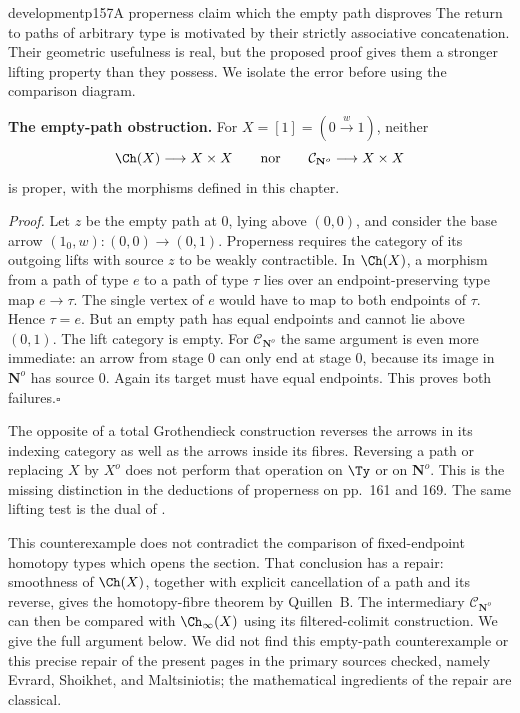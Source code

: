 \begin{dcomment}{development}{p157}{A properness claim which the empty path disproves}
The return to paths of arbitrary type is motivated by their strictly associative concatenation. Their geometric usefulness is real, but the proposed proof gives them a stronger lifting property than they possess. We isolate the error before using the comparison diagram.

\textbf{The empty-path obstruction.}\ours\quad
For $X=[1]=(0\xrightarrow{w}1)$, neither
\[
 \Ch(X)\longrightarrow X\times X
 \qquad\text{nor}\qquad
 \mathcal C_{\mathbf N^o}\longrightarrow X\times X
\]
is proper, with the morphisms defined in this chapter.

\emph{Proof.} Let $z$ be the empty path at $0$, lying above $(0,0)$, and consider the base arrow $(1_0,w):(0,0)\to(0,1)$. Properness requires the category of its outgoing lifts with source $z$ to be weakly contractible. In $\Ch(X)$, a morphism from a path of type $e$ to a path of type $\tau$ lies over an endpoint-preserving type map $e\to\tau$. The single vertex of $e$ would have to map to both endpoints of $\tau$. Hence $\tau=e$. But an empty path has equal endpoints and cannot lie above $(0,1)$. The lift category is empty. For $\mathcal C_{\mathbf N^o}$ the same argument is even more immediate: an arrow from stage $0$ can only end at stage $0$, because its image in $\mathbf N^o$ has source $0$. Again its target must have equal endpoints. This proves both failures.\hfill$\square$

The opposite of a total Grothendieck construction reverses the arrows in its indexing category as well as the arrows inside its fibres. Reversing a path or replacing $X$ by $X^o$ does not perform that operation on $\Ty$ or on $\mathbf N^o$. This is the missing distinction in the deductions of properness on pp.~161 and 169. The same lifting test is the dual of \citet[Theorem~1.2]{Maltsiniotis2005Asphericite}.

This counterexample does not contradict the comparison of fixed-endpoint homotopy types which opens the section. That conclusion has a repair: smoothness of $\Ch(X)$, together with explicit cancellation of a path and its reverse, gives the homotopy-fibre theorem by Quillen~B. The intermediary $\mathcal C_{\mathbf N^o}$ can then be compared with $\Ch_\infty(X)$ using its filtered-colimit construction. We give the full argument below. We did not find this empty-path counterexample or this precise repair of the present pages in the primary sources checked, namely Evrard, Shoikhet, and Maltsiniotis; the mathematical ingredients of the repair are classical.
\end{dcomment}

